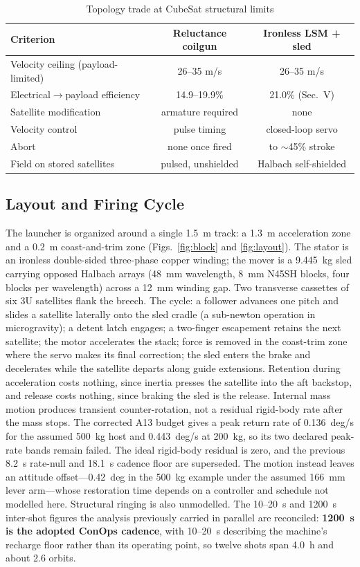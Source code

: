 \documentclass[conference]{IEEEtran}
\begin{document}
\begin{table}[t]
\caption{Topology trade at CubeSat structural limits}
\label{tab:trade}
\centering\footnotesize
\begin{tabular}{lcc}
\toprule
Criterion & Reluctance coilgun & Ironless LSM + sled\\
\midrule
Velocity ceiling (payload-limited) & 26--35 m/s & 26--35 m/s\\
Electrical$\rightarrow$payload efficiency & 14.9--19.9\% \cite{feng2025} & 21.0\% (Sec.~V)\\
Satellite modification & armature required & none\\
Velocity control & pulse timing & closed-loop servo\\
Abort & none once fired & to $\sim$45\% stroke\\
Field on stored satellites & pulsed, unshielded & Halbach self-shielded\\
\bottomrule
\end{tabular}
\end{table}

\subsection{Layout and Firing Cycle}
The launcher is organized around a single 1.5~m track: a 1.3~m acceleration zone and a 0.2~m coast-and-trim zone (Figs.~\ref{fig:block} and \ref{fig:layout}). The stator is an ironless double-sided three-phase copper winding; the mover is a 9.445~kg sled carrying opposed Halbach arrays (48~mm wavelength, 8~mm N45SH blocks, four blocks per wavelength) across a 12~mm winding gap. Two transverse cassettes of six 3U satellites flank the breech. The cycle: a follower advances one pitch and slides a satellite laterally onto the sled cradle (a sub-newton operation in microgravity); a detent latch engages; a two-finger escapement retains the next satellite; the motor accelerates the stack; force is removed in the coast-trim zone where the servo makes its final correction; the sled enters the brake and decelerates while the satellite departs along guide extensions. Retention during acceleration costs nothing, since inertia presses the satellite into the aft backstop, and release costs nothing, since braking the sled is the release. Internal mass motion produces transient counter-rotation, not a residual rigid-body rate after the mass stops. The corrected A13 budget gives a peak return rate of 0.136~deg/s for the assumed 500~kg host and 0.443~deg/s at 200~kg, so its two declared peak-rate bands remain failed. The ideal rigid-body residual is zero, and the previous 8.2~s rate-null and 18.1~s cadence floor are superseded. The motion instead leaves an attitude offset---0.42~deg in the 500~kg example under the assumed 166~mm lever arm---whose restoration time depends on a controller and schedule not modelled here. Structural ringing is also unmodelled. The 10--20~s and 1200~s inter-shot figures the analysis previously carried in parallel are reconciled: \textbf{1200~s is the adopted ConOps cadence}, with 10--20~s describing the machine's recharge floor rather than its operating point, so twelve shots span 4.0~h and about 2.6 orbits.
\end{document}
